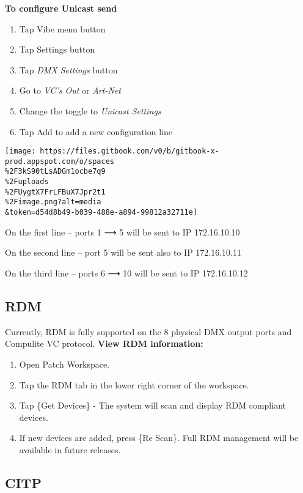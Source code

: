 \documentclass[
]{article}
\begin{document}
\textbf{To configure Unicast send}

\begin{enumerate}
\def\labelenumi{\arabic{enumi}.}
\item
  Tap Vibe menu button
\item
  Tap Settings button
\item
  Tap \emph{DMX Settings} button
\item
  Go to \emph{VC's Out} or \emph{Art-Net}
\item
  Change the toggle to \emph{Unicast Settings}
\item
  Tap Add to add a new configuration line
\end{enumerate}

\texttt{[image: https://files.gitbook.com/v0/b/gitbook-x-prod.appspot.com/o/spaces\\\%2F3kS90tLsADGm1ocbe7q9\\\%2Fuploads\\\%2FUygtX7FrLFBuX7Jpr2t1\\\%2Fimage.png?alt=media\\\&token=d54d8b49-b039-488e-a894-99812a32711e]}

On the first line -- ports 1 ⟶ 5 will be sent to IP 172.16.10.10

On the second line -- port 5 will be sent also to IP 172.16.10.11

On the third line -- ports 6 ⟶ 10 will be sent to IP 172.16.10.12

\hypertarget{rdm}{%
\subsection{RDM}\label{rdm}}

Currently, RDM is fully supported on the 8 physical DMX output ports and Compulite VC protocol. \textbf{View RDM information:}

\begin{enumerate}
\def\labelenumi{\arabic{enumi}.}
\item
  Open Patch Workspace.
\item
  Tap the RDM tab in the lower right corner of the workspace.
\item
  Tap \{Get Devices\} - The system will scan and display RDM compliant devices.
\item
  If new devices are added, press \{Re Scan\}. Full RDM management will be available in future releases.
\end{enumerate}

\hypertarget{citp}{%
\subsection{CITP}\label{citp}}
\end{document}
